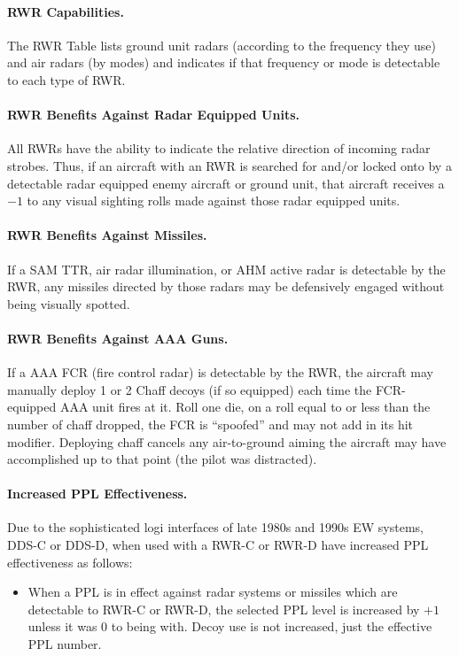 \paragraph{RWR Capabilities.} The RWR Table lists ground unit radars (according to the frequency they use) and air radars (by modes) and indicates if that frequency or mode is detectable to each type of RWR.

\paragraph{RWR Benefits Against Radar Equipped Units.} All RWRs have the ability to indicate the relative direction of incoming radar strobes. Thus, if an aircraft with an RWR is searched for and/or locked onto by a detectable radar equipped enemy aircraft or ground unit, that aircraft receives a $-1$ to any visual sighting rolls made against those radar equipped units.

\paragraph{RWR Benefits Against Missiles.} If a SAM TTR, air radar illumination, or AHM active radar is detectable by the RWR, any missiles directed by those radars may be defensively engaged without being visually spotted.

\paragraph{RWR Benefits Against AAA Guns.} If a AAA FCR (fire control radar) is detectable by the RWR, the aircraft may manually deploy 1 or 2 Chaff decoys (if so equipped) each time the FCR-equipped AAA unit fires at it. Roll one die, on a roll equal to or less than the number of chaff dropped, the FCR is “spoofed” and may not add in its hit modifier. Deploying chaff cancels any air-to-ground aiming the aircraft may have accomplished up to that point (the pilot was distracted).

\paragraph{Increased PPL Effectiveness.} Due to the sophisticated logi interfaces of late 1980s and 1990s EW systems, DDS-C or DDS-D, when used with a RWR-C or RWR-D have increased PPL effectiveness as follows:

\begin{itemize}
    \item When a PPL is in effect against radar systems or missiles which are detectable to RWR-C or RWR-D, the selected PPL level is increased by $+1$ unless it was 0 to being with. Decoy use is not increased, just the effective PPL number.
\end{itemize}

